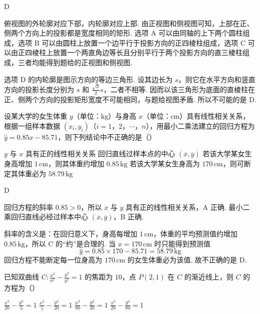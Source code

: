 \begin{answer}
D
\end{answer}

\begin{solution}
俯视图的外轮廓对应下部，内轮廓对应上部. 由正视图和侧视图可知，上部在正、侧两个方向上的投影都是宽度相同的矩形. 选项 A 可以由同轴的上下两个圆柱组成，选项 B 可以由圆柱上放置一个边平行于投影方向的正四棱柱组成，选项 C 可以由正四棱柱上放置一个两直角边等长且分别平行于两个投影方向的直三棱柱组成，三者均能得到题给的正视图和侧视图.

选项 D 的内轮廓是图示方向的等边三角形. 设其边长为 \(s\)，则它在水平方向和竖直方向的投影长度分别为 \(s\) 和 \(\frac{\sqrt3}{2}s\)，二者不相等. 因而以该三角形为底面的直棱柱在正、侧两个方向的投影矩形宽度不可能相同，与题给视图矛盾. 所以不可能的是 D.
\end{solution}

\begin{problem}
设某大学的女生体重 \(y\)（单位：\(\mathrm{kg}\)）与身高 \(x\)（单位：\(\mathrm{cm}\)）具有线性相关关系，根据一组样本数据 \((x_i,y_i)\)（\(i=1\)，\(2\)，\(\cdots\)，\(n\)），用最小二乘法建立的回归方程为 \(\hat{y}=0.85x-85.71\)，则下列结论中不正确的是（\quad）

\choices
    {\(y\) 与 \(x\) 具有正的线性相关关系}
    {回归直线过样本点的中心 \((\overline{x},\overline{y})\)}
    {若该大学某女生身高增加 \(1\,\mathrm{cm}\)，则其体重约增加 \(0.85\,\mathrm{kg}\)}
    {若该大学某女生身高为 \(170\,\mathrm{cm}\)，则可断定其体重必为 \(58.79\,\mathrm{kg}\)}
\end{problem}

\begin{answer}
D
\end{answer}

\begin{solution}
回归方程的斜率 \(0.85>0\)，所以 \(x\) 与 \(y\) 具有正的线性相关关系，A 正确. 最小二乘回归直线必经过样本中心 \((\overline{x},\overline{y})\)，B 正确.

斜率的含义是：在回归意义下，身高每增加 \(1\,\mathrm{cm}\)，体重的平均预测值约增加 \(0.85\,\mathrm{kg}\)，所以 C 的“约”是合理的. 当 \(x=170\,\mathrm{cm}\) 时只能得到预测值
\[
\hat y=0.85\times170-85.71=58.79\,\mathrm{kg}
\]
回归方程不能断定每一位身高为 \(170\,\mathrm{cm}\) 的女生体重必为该值. 故不正确的是 D.
\end{solution}

\begin{problem}
已知双曲线 \(C:\frac{x^2}{a^2}-\frac{y^2}{b^2}=1\) 的焦距为 \(10\)，点 \(P(2,1)\) 在 \(C\) 的渐近线上，则 \(C\) 的方程为（\quad）

\choices
    {\(\frac{x^2}{20}-\frac{y^2}{5}=1\)}
    {\(\frac{x^2}{5}-\frac{y^2}{20}=1\)}
    {\(\frac{x^2}{80}-\frac{y^2}{20}=1\)}
    {\(\frac{x^2}{20}-\frac{y^2}{80}=1\)}
\end{problem}

